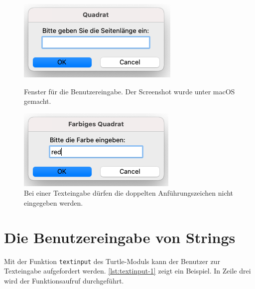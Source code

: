 \begin{figure}[H]
\centering
\begin{minipage}{0.45\textwidth}
\centering
\includegraphics[width=\textwidth]{input_quadrat}
\caption{Fenster für die Benutzereingabe. Der Screenshot wurde unter macOS gemacht.\protect\footnotemark}
\label{figure:numinput-1}
\end{minipage}
\hfill
\begin{minipage}{0.45\textwidth}
\centering
\includegraphics[width=\textwidth]{input_farbiges_quadrat}
\caption{Bei einer Texteingabe dürfen die doppelten Anführungszeichen nicht eingegeben werden.\protect\footnotemark}
\label{figure:textinput-1}
\end{minipage}
\end{figure}


\section{Die Benutzereingabe von Strings}

Mit der Funktion \lstinline[language={python3}]{textinput} des Turtle-Moduls kann der Benutzer zur Texteingabe aufgefordert werden. \autoref{lst:textinput-1} zeigt ein Beispiel. In Zeile drei wird der Funktionsaufruf durchgeführt.

